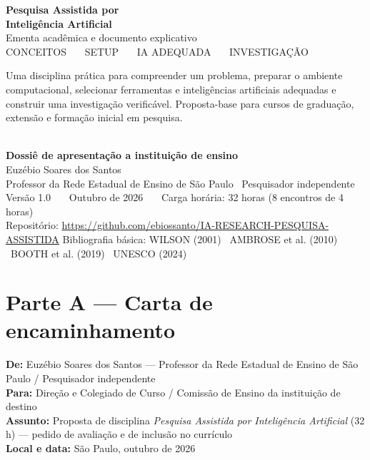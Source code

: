\documentclass[11pt,a4paper]{article}
\begin{document}
\begin{titlepage}
\centering
\vspace*{2cm}
{\Huge\bfseries Pesquisa Assistida por\\[6pt] Inteligência Artificial}\\[14pt]
{\Large Ementa acadêmica e documento explicativo}\\[26pt]
{\large CONCEITOS \ \textbullet\ \ SETUP \ \textbullet\ \ IA ADEQUADA \ \textbullet\ \ INVESTIGAÇÃO}\\[34pt]
\begin{minipage}{0.86\textwidth}
\small
Uma disciplina prática para compreender um problema, preparar o ambiente computacional,
selecionar ferramentas e inteligências artificiais adequadas e construir uma investigação
verificável. Proposta-base para cursos de graduação, extensão e formação inicial em pesquisa.
\end{minipage}\\[34pt]
{\large\bfseries Dossiê de apresentação a instituição de ensino}\\[18pt]
{\large Euzébio Soares dos Santos}\\[6pt]
{\small Professor da Rede Estadual de Ensino de São Paulo \textbar\ Pesquisador independente}\\[26pt]
{\small Versão 1.0 \ \textbar\ \ Outubro de 2026 \ \textbar\ \ Carga horária: 32 horas (8 encontros de 4 horas)}\\[10pt]
{\small Repositório: \url{https://github.com/ebiossanto/IA-RESEARCH-PESQUISA-ASSISTIDA}}
\vfill
{\small Bibliografia básica: WILSON (2001) \textbullet\ AMBROSE et al. (2010) \textbullet\ BOOTH et al. (2019) \textbullet\ UNESCO (2024)}
\end{titlepage}

\tableofcontents
\newpage

\section*{Parte A --- Carta de encaminhamento}

{\small
\textbf{De:} Euzébio Soares dos Santos --- Professor da Rede Estadual de Ensino de São Paulo / Pesquisador independente\\
\textbf{Para:} Direção e Colegiado de Curso / Comissão de Ensino da instituição de destino\\
\textbf{Assunto:} Proposta de disciplina \emph{Pesquisa Assistida por Inteligência Artificial} (32 h) --- pedido de avaliação e de inclusão no currículo\\
\textbf{Local e data:} São Paulo, outubro de 2026
}\par\bigskip
\end{document}

